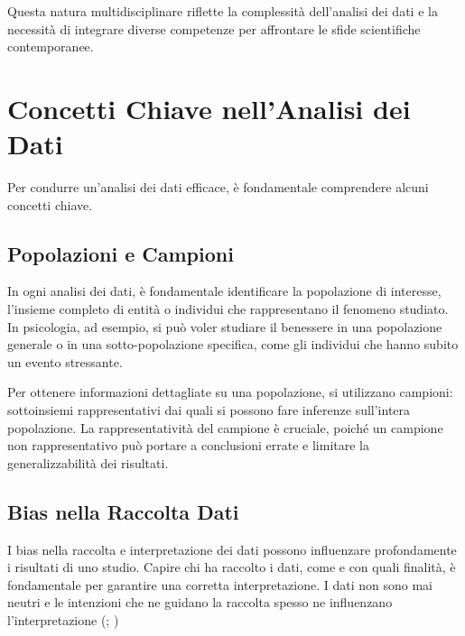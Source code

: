 \documentclass[
  letterpaper,
  DIV=11,
  numbers=noendperiod]{scrreprt}
\theoremstyle{definition}
\theoremstyle{remark}
\begin{document}
Questa natura multidisciplinare riflette la complessità dell'analisi dei
dati e la necessità di integrare diverse competenze per affrontare le
sfide scientifiche contemporanee.

\section{Concetti Chiave nell'Analisi dei
Dati}\label{concetti-chiave-nellanalisi-dei-dati}

Per condurre un'analisi dei dati efficace, è fondamentale comprendere
alcuni concetti chiave.

\subsection{Popolazioni e Campioni}\label{popolazioni-e-campioni}

In ogni analisi dei dati, è fondamentale identificare la popolazione di
interesse, l'insieme completo di entità o individui che rappresentano il
fenomeno studiato. In psicologia, ad esempio, si può voler studiare il
benessere in una popolazione generale o in una sotto-popolazione
specifica, come gli individui che hanno subito un evento stressante.

Per ottenere informazioni dettagliate su una popolazione, si utilizzano
campioni: sottoinsiemi rappresentativi dai quali si possono fare
inferenze sull'intera popolazione. La rappresentatività del campione è
cruciale, poiché un campione non rappresentativo può portare a
conclusioni errate e limitare la generalizzabilità dei risultati.

\subsection{Bias nella Raccolta Dati}\label{bias-nella-raccolta-dati}

I bias nella raccolta e interpretazione dei dati possono influenzare
profondamente i risultati di uno studio. Capire chi ha raccolto i dati,
come e con quali finalità, è fondamentale per garantire una corretta
interpretazione. I dati non sono mai neutri e le intenzioni che ne
guidano la raccolta spesso ne influenzano l'interpretazione
(;
)
\end{document}
